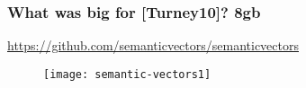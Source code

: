 	\begin{frame}[plain]
	 	\frametitle{What was big for [Turney10]? 8gb}
		\begin{block}{\begin{center}
          \url{https://github.com/semanticvectors/semanticvectors}
      \end{center}} 
      \begin{center}
        \begin{figure}[H]
          \centering
          \texttt{[image: semantic-vectors1]}
        \end{figure}
      \end{center}
		\end{block} 
	\end{frame}

